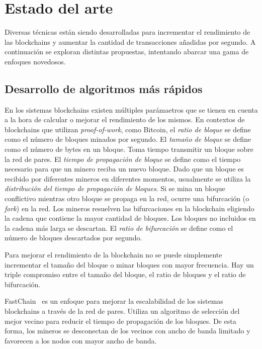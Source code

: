 \section{Estado del arte}
Diversas técnicas están siendo desarrolladas para incrementar el rendimiento de las blockchains y
aumentar la cantidad de transacciones añadidas por segundo.
%
A continuación se exploran distintas propuestas, intentando abarcar una gama de enfoques novedosos.

\subsection{Desarrollo de algoritmos más rápidos}

En los sistemas blockchains existen múltiples parámaetros que se tienen en cuenta
a la hora de calcular o mejorar el rendimiento de los mismos.
%
En contextos de blockchains que utilizan \emph{proof-of-work}, como Bitcoin, el \emph{ratio de bloque}
se define como el número de bloques minados por segundo.
%
El \emph{tamaño de bloque} se define como el número de bytes en un bloque.
%
Toma tiempo transmitir un bloque sobre la red de pares.
%
El \emph{tiempo de propagación de bloque} se define como el tiempo necesario para que un minero
reciba un nuevo bloque.
%
Dado que un bloque es recibido por diferentes mineros en diferentes momentos, usualmente se utiliza
la \emph{distribución del tiempo de propagación de bloques}.
%
Si se mina un bloque conflictivo mientras otro bloque se propaga en la red, ocurre una bifurcación
(o \emph{fork}) en la red.
%
Los mineros resuelven las bifurcaciones en la blockchain eligiendo la cadena que contiene la mayor
cantidad de bloques.
%
Los bloques no incluidos en la cadena más larga se descartan.
%
El \emph{ratio de bifurcación} se define como el número de bloques descartados por segundo.

Para mejorar el rendimiento de la blockchain no se puede simplemente incrementar el tamaño del bloque
o minar bloques con mayor frecuencia.
%
Hay un triple compromiso entre el tamaño del bloque, el ratio de bloques y el ratio de bifurcación.

FastChain~\cite{fastchain} es un enfoque para mejorar la escalabilidad de los sistemas blockchains
a través de la red de pares.
%
Utiliza un algoritmo de selección del mejor vecino para reducir el tiempo de propagación de los bloques.
%
De esta forma, los mineros se desconectan de los vecinos con ancho de banda limitado y
favorecen a los nodos con mayor ancho de banda.

